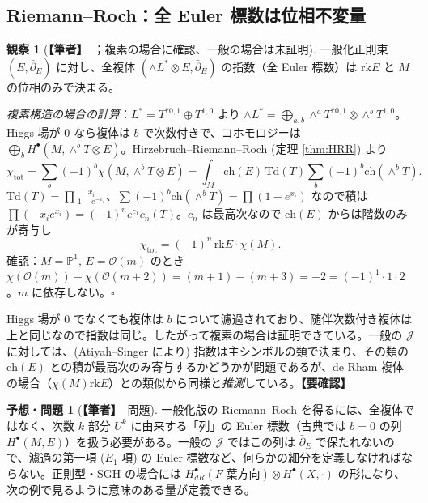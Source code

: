 \documentclass[11pt,a4paper]{article}
\theoremstyle{definition}
\newtheorem{obs}[defn]{観察}
\newtheorem{conj}[defn]{予想・問題}
\newcommand{\own}{\textcolor{red!65!black}{\textbf{【筆者】}}}
\newcommand{\chk}{\textcolor{orange!80!black}{\textbf{【要確認】}}}
\newcommand{\Jc}{\mathcal J}
\newcommand{\dbar}{\bar\partial}
\newcommand{\ch}{\mathrm{ch}}\newcommand{\Td}{\mathrm{Td}}
\newcommand{\rk}{\mathrm{rk}}
\begin{document}
\subsection{Riemann--Roch：全 Euler 標数は位相不変量}\label{sec:euler}
\begin{obs}[\own\ ；複素の場合に確認、一般の場合は未証明]
一般化正則束 $(E,\dbar_E)$ に対し、全複体 $(\wedge L^*\otimes E,\dbar_E)$ の指数（全 Euler 標数）は $\rk E$ と $M$ の位相のみで決まる。
\end{obs}
\emph{複素構造の場合の計算}：$L^*=T^{*0,1}\oplus T^{1,0}$ より $\wedge L^*=\bigoplus_{a,b}\wedge^aT^{*0,1}\otimes\wedge^bT^{1,0}$。Higgs 場が $0$ なら複体は $b$ で次数付きで、コホモロジーは $\bigoplus_bH^\bullet(M,\wedge^bT\otimes E)$。Hirzebruch--Riemann--Roch (定理 \ref{thm:HRR}) より
\[\chi_{\mathrm{tot}}=\sum_{b}(-1)^b\chi(M,\wedge^bT\otimes E)=\int_M\ch(E)\,\Td(T)\sum_b(-1)^b\ch(\wedge^bT).\]
$\Td(T)=\prod\frac{x_i}{1-e^{-x_i}}$、$\sum(-1)^b\ch(\wedge^bT)=\prod(1-e^{x_i})$ なので積は $\prod(-x_ie^{x_i})=(-1)^ne^{c_1}c_n(T)$。$c_n$ は最高次なので $\ch(E)$ からは階数のみが寄与し
\[\chi_{\mathrm{tot}}=(-1)^n\,\rk E\cdot\chi(M).\]
確認：$M=\mathbb P^1$, $E=\mathcal O(m)$ のとき $\chi(\mathcal O(m))-\chi(\mathcal O(m+2))=(m+1)-(m+3)=-2=(-1)^1\cdot1\cdot2$。$m$ に依存しない。$\square$

Higgs 場が $0$ でなくても複体は $b$ について濾過されており、随伴次数付き複体は上と同じなので指数は同じ。したがって複素の場合は証明できている。一般の $\Jc$ に対しては、(Atiyah--Singer により) 指数は主シンボルの類で決まり、その類の $\ch(E)$ との積が最高次のみ寄与するかどうかが問題であるが、de Rham 複体の場合（$\chi(M)\rk E$）との類似から同様と\emph{推測}している。\chk

\begin{conj}[\own\ 問題]
一般化版の Riemann--Roch を得るには、全複体ではなく、次数 $k$ 部分 $U^k$ に由来する「列」の Euler 標数（古典では $b=0$ の列 $H^\bullet(M,E)$）を扱う必要がある。一般の $\Jc$ ではこの列は $\dbar_E$ で保たれないので、濾過の第一項 ($E_1$ 項) の Euler 標数など、何らかの細分を定義しなければならない。正則型・SGH の場合には $H^\bullet_{dR}(F\text{-葉方向})\otimes H^\bullet(X,\cdot)$ の形になり、次の例で見るように意味のある量が定義できる。
\end{conj}
\end{document}
